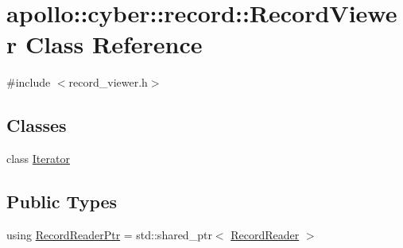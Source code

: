 \hypertarget{classapollo_1_1cyber_1_1record_1_1RecordViewer}{\section{apollo\-:\-:cyber\-:\-:record\-:\-:Record\-Viewer Class Reference}
\label{classapollo_1_1cyber_1_1record_1_1RecordViewer}
}


{\ttfamily \#include $<$record\-\_\-viewer.\-h$>$}

\subsection*{Classes}
\begin{DoxyCompactItemize}
\item 
class \hyperlink{classapollo_1_1cyber_1_1record_1_1RecordViewer_1_1Iterator}{Iterator}
\end{DoxyCompactItemize}
\subsection*{Public Types}
\begin{DoxyCompactItemize}
\item 
using \hyperlink{classapollo_1_1cyber_1_1record_1_1RecordViewer_a70f4191b0d79cbc8d8213f1227fd8609}{Record\-Reader\-Ptr} = std\-::shared\-\_\-ptr$<$ \hyperlink{classapollo_1_1cyber_1_1record_1_1RecordReader}{Record\-Reader} $>$
\end{DoxyCompactItemize}
